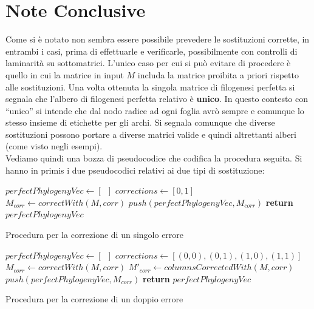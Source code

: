 \documentclass[a4paper,12pt, oneside]{book}
\begin{document}
\section{Note Conclusive}
Come si è notato non sembra essere possibile prevedere le sostituzioni corrette,
in entrambi i casi, prima di effettuarle e verificarle, possibilmente con
controlli di laminarità su sottomatrici. L'unico caso per cui si può evitare di
procedere è quello in cui la matrice in input $M$ includa la matrice proibita
a priori rispetto alle sostituzioni.
Una volta ottenuta la singola matrice di filogenesi perfetta si segnala che
l'albero di filogenesi perfetta relativo è \textbf{unico}. In questo contesto
con ``unico'' si intende 
che dal nodo radice ad ogni foglia avrò sempre e comunque lo stesso insieme di
etichette per gli archi. Si segnala comunque che diverse sostituzioni possono
portare a diverse matrici valide e quindi altrettanti alberi (come visto negli
esempi).\\ 
Vediamo quindi una bozza di pseudocodice che codifica la procedura seguita. Si
hanno in primis i due pseudocodici relativi ai due tipi di sostituzione:
\begin{algorithm}[H]
  \small
  \begin{algorithmic}[1]
    \State $perfectPhylogenyVec\gets[\,\,\,]$
    \State $corrections \gets [0,1]$
    \State $M_{corr}\gets correctWith(M, corr)$
    \State $push(perfectPhylogenyVec, M_{corr})$
    \EndIf
    \EndFor
    \State \textbf{return} $perfectPhylogenyVec$
    \EndFunction
  \end{algorithmic}
  \caption{Procedura per la correzione di un singolo errore}
\end{algorithm}
\begin{algorithm}[H]
  \small
  \begin{algorithmic}[1]
    \State $perfectPhylogenyVec\gets[\,\,\,]$
    \State $corrections \gets [(0,0), (0,1), (1,0), (1,1)]$
    \State $M_{corr}\gets correctWith(M, corr)$
    \State $M'_{corr}\gets columnsCorrectedWith(M, corr)$
    \State $push(perfectPhylogenyVec, M_{corr})$
    \EndIf
    \EndFor
    \State \textbf{return} $perfectPhylogenyVec$
    \EndFunction
  \end{algorithmic}
  \caption{Procedura per la correzione di un doppio errore}
\end{algorithm}
\end{document}
